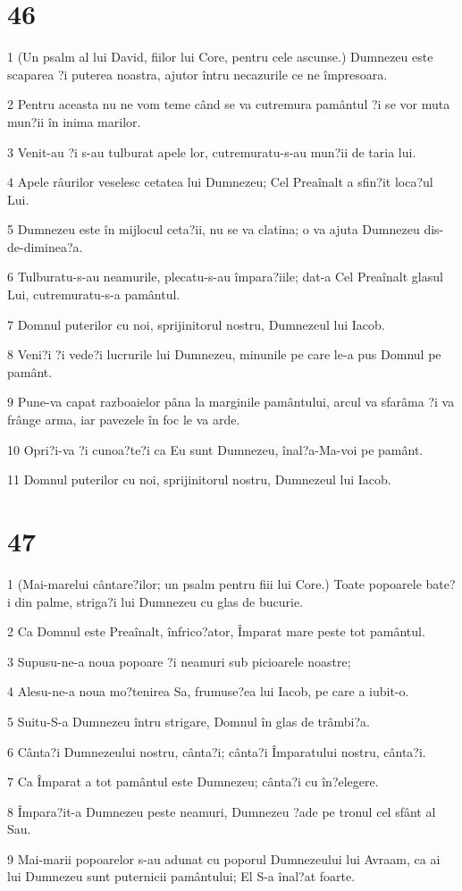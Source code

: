 \chapter{46}

\par 1 (Un psalm al lui David, fiilor lui Core, pentru cele ascunse.) Dumnezeu este scaparea ?i puterea noastra, ajutor întru necazurile ce ne împresoara.
\par 2 Pentru aceasta nu ne vom teme când se va cutremura pamântul ?i se vor muta mun?ii în inima marilor.
\par 3 Venit-au ?i s-au tulburat apele lor, cutremuratu-s-au mun?ii de taria lui.
\par 4 Apele râurilor veselesc cetatea lui Dumnezeu; Cel Preaînalt a sfin?it loca?ul Lui.
\par 5 Dumnezeu este în mijlocul ceta?ii, nu se va clatina; o va ajuta Dumnezeu dis-de-diminea?a.
\par 6 Tulburatu-s-au neamurile, plecatu-s-au împara?iile; dat-a Cel Preaînalt glasul Lui, cutremuratu-s-a pamântul.
\par 7 Domnul puterilor cu noi, sprijinitorul nostru, Dumnezeul lui Iacob.
\par 8 Veni?i ?i vede?i lucrurile lui Dumnezeu, minunile pe care le-a pus Domnul pe pamânt.
\par 9 Pune-va capat razboaielor pâna la marginile pamântului, arcul va sfarâma ?i va frânge arma, iar pavezele în foc le va arde.
\par 10 Opri?i-va ?i cunoa?te?i ca Eu sunt Dumnezeu, înal?a-Ma-voi pe pamânt.
\par 11 Domnul puterilor cu noi, sprijinitorul nostru, Dumnezeul lui Iacob.

\chapter{47}

\par 1 (Mai-marelui cântare?ilor; un psalm pentru fiii lui Core.) Toate popoarele bate?i din palme, striga?i lui Dumnezeu cu glas de bucurie.
\par 2 Ca Domnul este Preaînalt, înfrico?ator, Împarat mare peste tot pamântul.
\par 3 Supusu-ne-a noua popoare ?i neamuri sub picioarele noastre;
\par 4 Alesu-ne-a noua mo?tenirea Sa, frumuse?ea lui Iacob, pe care a iubit-o.
\par 5 Suitu-S-a Dumnezeu întru strigare, Domnul în glas de trâmbi?a.
\par 6 Cânta?i Dumnezeului nostru, cânta?i; cânta?i Împaratului nostru, cânta?i.
\par 7 Ca Împarat a tot pamântul este Dumnezeu; cânta?i cu în?elegere.
\par 8 Împara?it-a Dumnezeu peste neamuri, Dumnezeu ?ade pe tronul cel sfânt al Sau.
\par 9 Mai-marii popoarelor s-au adunat cu poporul Dumnezeului lui Avraam, ca ai lui Dumnezeu sunt puternicii pamântului; El S-a înal?at foarte.

